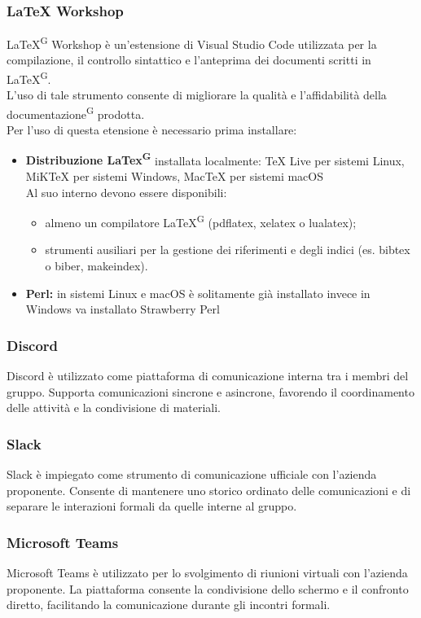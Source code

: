 \documentclass[a4paper, 11pt]{article}
\begin{document}
\subsubsection{LaTeX Workshop}
LaTeX\textsuperscript{G} Workshop è un'estensione di Visual Studio Code utilizzata per la compilazione, il controllo sintattico e l'anteprima dei documenti scritti in LaTeX\textsuperscript{G}. \\
L'uso di tale strumento consente di migliorare la qualità e l'affidabilità della documentazione\textsuperscript{G} prodotta.\\
Per l'uso di questa etensione è necessario prima installare:
\begin{itemize}
    \item \textbf{Distribuzione LaTex\textsuperscript{G} } installata localmente: TeX Live per sistemi Linux, MiKTeX per sistemi Windows, MacTeX per sistemi macOS\\
    Al suo interno devono essere disponibili:
    \begin{itemize}
        \item almeno un compilatore LaTeX\textsuperscript{G} (pdflatex, xelatex o lualatex);
        \item strumenti ausiliari per la gestione dei riferimenti e degli indici (es. bibtex o biber, makeindex).
    \end{itemize}
    \item \textbf{Perl: }in sistemi Linux e macOS è solitamente già installato invece in Windows va installato Strawberry Perl
\end{itemize}
\subsubsection{Discord}
Discord è utilizzato come piattaforma di comunicazione interna tra i membri del gruppo. Supporta comunicazioni sincrone e asincrone, 
favorendo il coordinamento delle attività e la condivisione di materiali.
\subsubsection{Slack}
Slack è impiegato come strumento di comunicazione ufficiale con l'azienda proponente. Consente di mantenere uno storico ordinato delle comunicazioni e di separare le interazioni formali da quelle interne al gruppo.
\subsubsection{Microsoft Teams}
Microsoft Teams è utilizzato per lo svolgimento di riunioni virtuali con l'azienda proponente. La piattaforma consente la condivisione dello schermo e il confronto diretto, facilitando la comunicazione durante gli incontri formali.
\end{document}
